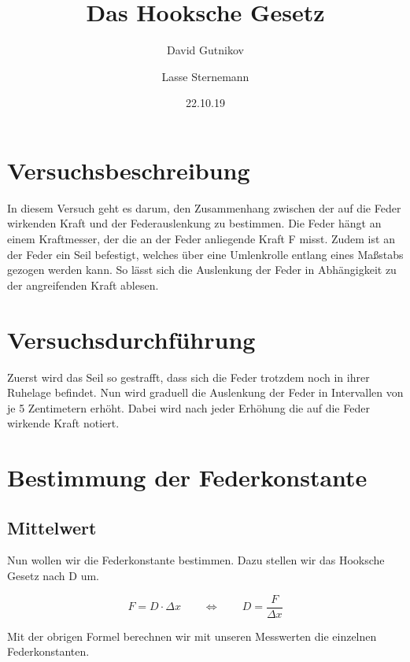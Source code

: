 \documentclass[titlepage = firstcover]{scrartcl}
\title{Das Hooksche Gesetz}
\author{David Gutnikov \and Lasse Sternemann}
\date{22.10.19}
\begin{document}
    \maketitle


    \section{Versuchsbeschreibung}
        In diesem Versuch geht es darum, den Zusammenhang zwischen der auf die Feder wirkenden Kraft und der Federauslenkung zu bestimmen.
        Die Feder hängt an einem Kraftmesser, der die an der Feder anliegende Kraft F misst. Zudem ist an der Feder ein Seil befestigt, 
        welches über eine Umlenkrolle entlang eines Maßstabs gezogen werden kann. So lässt sich die Auslenkung der Feder in Abhängigkeit zu
        der angreifenden Kraft ablesen.

    \section{Versuchsdurchführung}
        Zuerst wird das Seil so gestrafft, dass sich die Feder trotzdem noch in ihrer Ruhelage befindet. Nun wird graduell die Auslenkung der 
        Feder in Intervallen von je 5 Zentimetern erhöht. Dabei wird nach jeder Erhöhung die auf die Feder wirkende Kraft notiert.

        
    \section{Bestimmung der Federkonstante}

      \subsection{Mittelwert}
        Nun wollen wir die Federkonstante bestimmen. Dazu stellen wir das Hooksche Gesetz nach D um.

        \begin{equation}
            F = D \cdot \Delta x  \qquad \Leftrightarrow  \qquad D = \frac{F}{\Delta x}
        \end{equation} 

      

        Mit der obrigen Formel berechnen wir mit unseren Messwerten die einzelnen Federkonstanten. 
\end{document}
